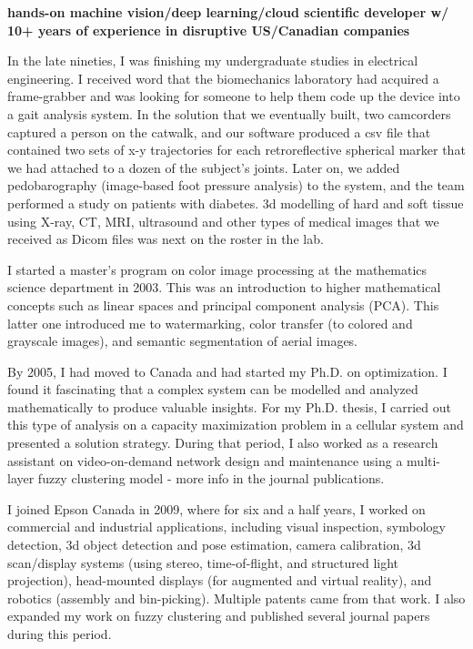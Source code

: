 \onehalfspace
\textbf{\large hands-on machine vision/deep learning/cloud scientific developer w/ 10+ years of experience in disruptive US/Canadian companies}
\singlespace

\vspace{0.8cm}

In the late nineties, I was finishing my undergraduate studies in electrical engineering. I received word that the biomechanics laboratory had acquired a frame-grabber and was looking for someone to help them code up the device into a gait analysis system. In the solution that we eventually built, two camcorders captured a person on the catwalk, and our software produced a csv file that contained two sets of x-y trajectories for each retroreflective spherical marker that we had attached to a dozen of the subject’s joints. Later on, we added pedobarography (image-based foot pressure analysis) to the system, and the team performed a study on patients with diabetes. 3d modelling of hard and soft tissue using X-ray, CT, MRI, ultrasound and other types of medical images that we received as Dicom files was next on the roster in the lab.

\newcommand{\osspacing}{\vspace{0.5cm}}

\osspacing
I started a master’s program on color image processing at the mathematics science department in 2003. This was an introduction to higher mathematical concepts such as linear spaces and principal component analysis (PCA). This latter one introduced me to watermarking, color transfer (to colored and grayscale images), and semantic segmentation of aerial images.

\osspacing
By 2005, I had moved to Canada and had started my Ph.D. on optimization. I found it fascinating that a complex system can be modelled and analyzed mathematically to produce valuable insights. For my Ph.D. thesis, I carried out this type of analysis on a capacity maximization problem in a cellular system and presented a solution strategy. During that period, I also worked as a research assistant on video-on-demand network design and maintenance using a multi-layer fuzzy clustering model - more info in the journal publications.

\osspacing
I joined Epson Canada in 2009, where for six and a half years, I worked on commercial and industrial applications, including visual inspection, symbology detection, 3d object detection and pose estimation, camera calibration, 3d scan/display systems (using stereo, time-of-flight, and structured light projection), head-mounted displays (for augmented and virtual reality), and robotics (assembly and bin-picking). Multiple patents came from that work. I also expanded my work on fuzzy clustering and published several journal papers during this period.			

